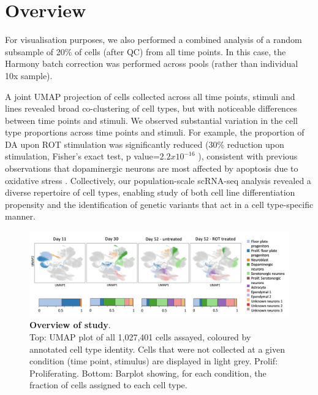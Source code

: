 \newpage

\section{Overview}

For visualisation purposes, we also performed a combined analysis of a random subsample of 20\% of cells (after QC) from all time points.
In this case, the Harmony batch correction was performed across pools (rather than individual 10x sample).

A joint UMAP projection of cells collected across all time points, stimuli and lines revealed broad co-clustering of cell types, but with noticeable differences between time points and stimuli. 
We observed substantial variation in the cell type proportions across time points
and stimuli. 
For example, the proportion of DA upon ROT stimulation was significantly reduced (30\% reduction upon stimulation, Fisher’s exact test, p value=$2.2x10^{-16}$ ), consistent with previous observations that dopaminergic neurons are most affected by apoptosis due to oxidative stress \cite{sherer2003mechanism, knonagel1992autologous, cannon2009highly}.
Collectively, our population-scale scRNA-seq analysis revealed a diverse repertoire of cell types, enabling study of both cell line differentiation propensity and the identification of genetic variants that act in a cell type-specific manner.

\begin{figure}[h]
\centering
\includegraphics[width=16cm]{Chapter5/Fig/neuroseq_overview.png}
\caption[Overview of study]{\textbf{Overview of study}.\\
Top: UMAP plot of all 1,027,401 cells assayed, coloured by annotated cell type identity. Cells that were not collected at a given condition (time point, stimulus) are displayed in light grey. Prolif: Proliferating. 
Bottom: Barplot showing, for each condition, the fraction of cells assigned to each cell type.}
\label{fig:neuroseq_overview}
\end{figure}

